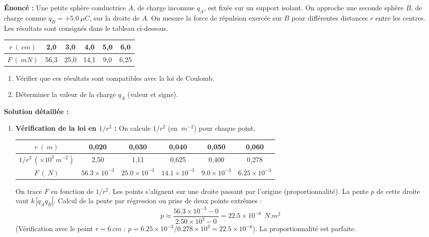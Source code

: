 \documentclass[11pt]{article}
\begin{document}
\begin{exoresolu}
\textbf{Énoncé :} Une petite sphère conductrice $A$, de charge inconnue $q_A$, est fixée sur un support isolant. On approche une seconde sphère $B$, de charge connue $q_B = +\num{5,0}\ \mu C$, sur la droite de $A$. On mesure la force de répulsion exercée sur $B$ pour différentes distances $r$ entre les centres. Les résultats sont consignés dans le tableau ci-dessous.

\begin{center}
\begin{tabular}{|c|c|c|c|c|c|}\hline
$r\ (\SI{}{cm})$ & 2,0 & 3,0 & 4,0 & 5,0 & 6,0 \\ \hline
$F\ (\SI{}{mN})$ & 56,3 & 25,0 & 14,1 & 9,0 & 6,25 \\ \hline
\end{tabular}
\end{center}

\begin{enumerate}
    \item Vérifier que ces résultats sont compatibles avec la loi de Coulomb.
    \item Déterminer la valeur de la charge $q_A$ (valeur et signe).
\end{enumerate}

\tcblower

\textbf{Solution détaillée :}

\begin{enumerate}
    \item \textbf{Vérification de la loi en $1/r^2$ :}
    On calcule $1/r^2$ (en $\SI{}{m^{-2}}$) pour chaque point.
    \begin{center}
    \begin{tabular}{|c|c|c|c|c|c|}\hline
    $r\ (\SI{}{m})$ & 0,020 & 0,030 & 0,040 & 0,050 & 0,060 \\ \hline
    $1/r^2\ (\times 10^3 \SI{}{m^{-2}})$ & 2,50 & 1,11 & 0,625 & 0,400 & 0,278 \\ \hline
    $F\ (\SI{}{N})$ & $\num{56,3}\times10^{-3}$ & $\num{25,0}\times10^{-3}$ & $\num{14,1}\times10^{-3}$ & $\num{9,0}\times10^{-3}$ & $\num{6,25}\times10^{-3}$ \\ \hline
    \end{tabular}
    \end{center}
    On trace $F$ en fonction de $1/r^2$. Les points s'alignent sur une droite passant par l'origine (proportionnalité). La pente $p$ de cette droite vaut $k\,|q_A q_B|$.
    Calcul de la pente par régression ou prise de deux points extrêmes :
    \[
    p \approx \frac{\num{56,3} \times 10^{-3} - 0}{\num{2,50} \times 10^3 - 0} = \num{22,5} \times 10^{-6}\ \SI{}{N.m^2}
    \]
    (Vérification avec le point $r=6\ cm$ : $p = \num{6,25}\times10^{-3} / \num{0,278}\times10^3 = \num{22,5}\times10^{-6}$). La proportionnalité est parfaite.


\end{enumerate}
\end{exoresolu}
\end{document}
